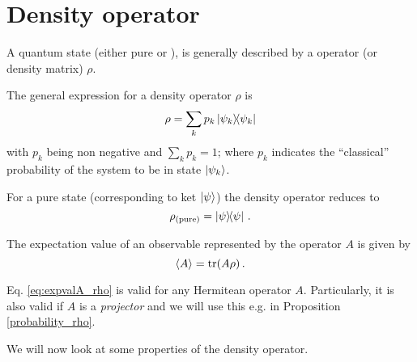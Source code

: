 \section{Density operator}\label{app:density}

A quantum state (either pure or ),
is generally described by a  operator (or density matrix) $\rho$.

The general expression for a density operator $\rho$ is
$$
  \rho = \sum_{k}p_{k}\ketbra{\psi_{k}}
$$
with $p_{k}$ being non negative and $\sum_{k}p_{k} = 1$;
where $p_k$ indicates the ``classical'' probability of the system to be in state $\ket{\psi_{k}}$.

For a pure state (corresponding to ket $\ket{\psi}$) the density operator reduces to
\[
  \rho_{(\text{pure})} = \ketbra{\psi}\,\text{.}
\]

The expectation value of an observable represented by the operator $A$
is given by \parencite{open_systems}
\begin{equation}\label{eq:expvalA_rho}
  \expval{A} = \tr(A\rho)\,.
\end{equation}

Eq. \eqref{eq:expvalA_rho} is valid for any Hermitean operator $A$. Particularly,
it is also valid if $A$ is a \emph{projector} and we will use this
e.g. in Proposition \ref{probability_rho}.

We will now look at some properties of the density operator.

